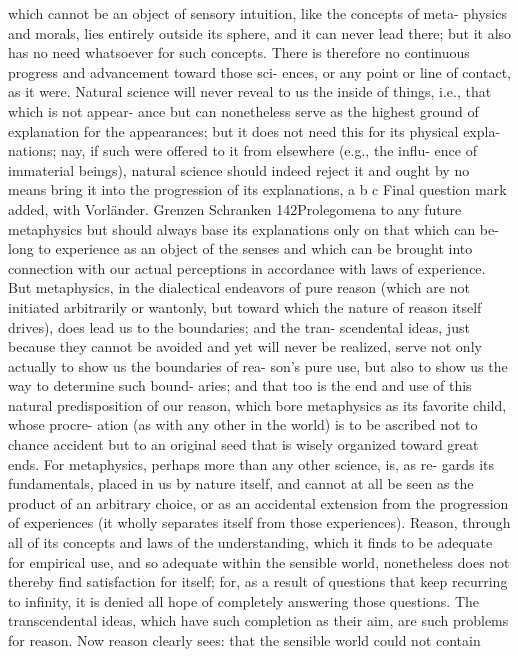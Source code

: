 which cannot be an object of sensory intuition, like the concepts of meta-
physics and morals, lies entirely outside its sphere, and it can never lead
there; but it also has no need whatsoever for such concepts. There is
therefore no continuous progress and advancement toward those sci-
ences, or any point or line of contact, as it were. Natural science will
never reveal to us the inside of things, i.e., that which is not appear-
ance but can nonetheless serve as the highest ground of explanation
for the appearances; but it does not need this for its physical expla-
nations; nay, if such were offered to it from elsewhere (e.g., the inﬂu-
ence of immaterial beings), natural science should indeed reject it and
ought by no means bring it into the progression of its explanations,
a
b
c
Final question mark added, with Vorländer.
Grenzen
Schranken
142Prolegomena to any future metaphysics
but should always base its explanations only on that which can be-
long to experience as an object of the senses and which can be brought
into connection with our actual perceptions in accordance with laws of
experience.
But metaphysics, in the dialectical endeavors of pure reason (which
are not initiated arbitrarily or wantonly, but toward which the nature
of reason itself drives), does lead us to the boundaries; and the tran-
scendental ideas, just because they cannot be avoided and yet will never
be realized, serve not only actually to show us the boundaries of rea-
son’s pure use, but also to show us the way to determine such bound-
aries; and that too is the end and use of this natural predisposition of
our reason, which bore metaphysics as its favorite child, whose procre-
ation (as with any other in the world) is to be ascribed not to chance
accident but to an original seed that is wisely organized toward great
ends. For metaphysics, perhaps more than any other science, is, as re-
gards its fundamentals, placed in us by nature itself, and cannot at all be
seen as the product of an arbitrary choice, or as an accidental extension
from the progression of experiences (it wholly separates itself from those
experiences).
Reason, through all of its concepts and laws of the understanding,
which it ﬁnds to be adequate for empirical use, and so adequate within the
sensible world, nonetheless does not thereby ﬁnd satisfaction for itself;
for, as a result of questions that keep recurring to inﬁnity, it is denied
all hope of completely answering those questions. The transcendental
ideas, which have such completion as their aim, are such problems for
reason. Now reason clearly sees: that the sensible world could not contain

